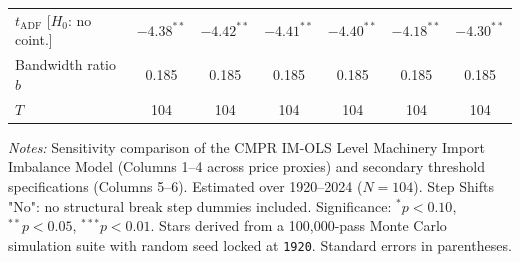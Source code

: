 \begin{table}[htbp]
\begin{tabular}{@{}lcccccc@{}}
		$t_{\text{ADF}}$ [$H_0$: no coint.] & $-4.38^{**}$ & $-4.42^{**}$ & $-4.41^{**}$ & $-4.40^{**}$ & $-4.18^{**}$ & $-4.30^{**}$ \\
		Bandwidth ratio $b$ & 0.185 & 0.185 & 0.185 & 0.185 & 0.185 & 0.185 \\
		$T$ & 104 & 104 & 104 & 104 & 104 & 104 \\
		\bottomrule
	\end{tabular}
	\begin{minipage}{\textwidth}
		\scriptsize
		\textit{Notes:} Sensitivity comparison of the CMPR IM-OLS Level Machinery Import Imbalance Model (Columns 1--4 across price proxies) and secondary threshold specifications (Columns 5--6). Estimated over 1920--2024 ($N=104$). Step Shifts "No": no structural break step dummies included. Significance: $^{*}p<0.10$, $^{**}p<0.05$, $^{***}p<0.01$. Stars derived from a 100,000-pass Monte Carlo simulation suite with random seed locked at \texttt{1920}. Standard errors in parentheses.
	\end{minipage}
\end{table}
